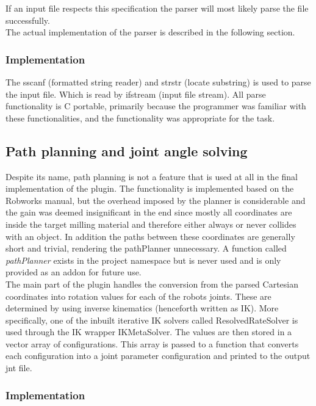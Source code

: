 If an input file respects this specification the parser will most likely parse the file successfully.\\

The actual implementation of the parser is described in the following section.

\subsubsection{Implementation}
\label{sec:parserImpl}
The sscanf (formatted string reader) and strstr (locate substring) is used to parse the input file. Which is read by ifstream (input file stream). All parse functionality is C portable, primarily because the programmer was familiar with these functionalities, and the functionality was appropriate for the task.  

\subsection{Path planning and joint angle solving}
\label{sec:pathplanning}
Despite its name, path planning is not a feature that is used at all in the final implementation of the plugin. The functionality is implemented based on the Robworks manual, but the overhead imposed by the planner is considerable and the gain was deemed insignificant in the end since mostly all coordinates are inside the target milling material and therefore either always or never collides with an object. In addition the paths between these coordinates are generally short and trivial, rendering the pathPlanner unnecessary. A function called \textit{pathPlanner} exists in the project namespace but is never used and is only provided as an addon for future use.\\

The main part of the plugin handles the conversion from the parsed Cartesian coordinates into rotation values for each of the robots joints. These are determined by using inverse kinematics (henceforth written as IK). More specifically, one of the inbuilt iterative IK solvers called ResolvedRateSolver is used through the IK wrapper IKMetaSolver. The values are then stored in a vector array of configurations. This array is passed to a function that converts each configuration into a joint parameter configuration and printed to the output jnt file.

\subsubsection{Implementation}
\label{sec:pathplanningImpl}


